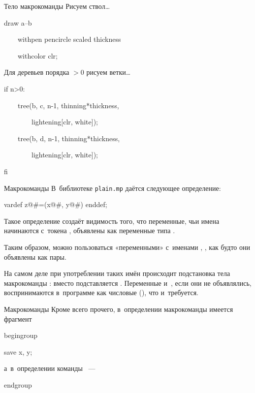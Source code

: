 \begin{frame}{Тело макрокоманды }
Рисуем ствол…
\begin{programlisting}
draw a--b\par
~~~~withpen pencircle scaled thickness\par
~~~~withcolor clr;
\end{programlisting}

Для деревьев порядка ${}>0$ рисуем ветки…
\begin{programlisting}
if n>0:\par
~~~~tree(b, c, n-1, thinning*thickness,\par
~~~~~~~~lightening[clr, white]);\par
~~~~tree(b, d, n-1, thinning*thickness,\par
~~~~~~~~lightening[clr, white]);\par
fi
\end{programlisting}
\end{frame}

\begin{frame}{Макрокоманды }
В~библиотеке \nolinkurl{plain.mp} даётся следующее определение:
\begin{programlisting}
vardef z@\#=(x@\#, y@\#) enddef;
\end{programlisting}
Такое определение создаёт видимость того, что переменные, чьи имена начинаются
с~токена , объявлены как переменные типа .

Таким образом, можно пользоваться «переменными» с~именами ,
,  как будто они объявлены как пары.

На самом деле при употреблении таких имён происходит подстановка тела
макрокоманды : вместо  подставляется
. Переменные 
и~, если они не объявлялись, воспринимаются в~программе как
числовые (), что и~требуется.
\end{frame}

\begin{frame}{Макрокоманды }
Кроме всего прочего, в~определении макрокоманды  имеется
фрагмент
\begin{programlisting}
begingroup\par
save x, y;\par
\end{programlisting}
а~в~определении команды ~—
\begin{programlisting}
endgroup
\end{programlisting}
\end{frame}

